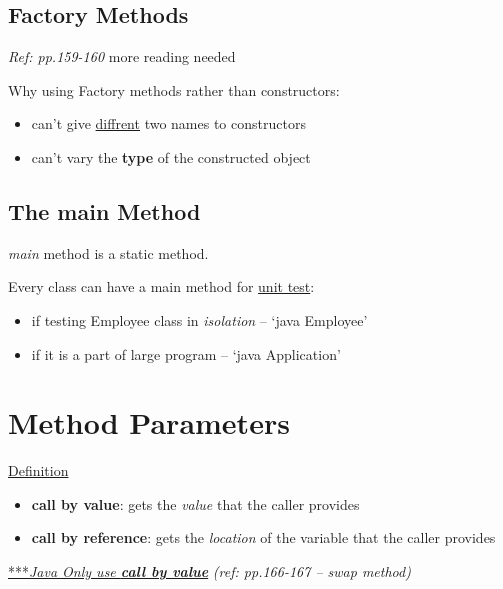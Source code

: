 \documentclass[12pt]{article}
\begin{document}
\subsection{Factory Methods}
\textit{Ref: pp.159-160} more reading needed

Why using Factory methods rather than constructors:
\begin{itemize}
    \item can't give \underline{diffrent} two names to constructors
    \item can't vary the \textbf{type} of the constructed object
\end{itemize}

\subsection{The main Method}
\emph{main} method is a static method.

Every class can have a main method for \underline{unit test}:
\begin{itemize}
    \item if testing Employee class in \textit{isolation} -- `java Employee'
    \item if it is a part of large program -- `java Application'
\end{itemize}

\section{Method Parameters}
\underline{Definition}
\begin{itemize}
    \item \textbf{call by value}: gets the \textit{value} that the caller provides
    \item \textbf{call by reference}: gets the \textit{location} of the variable that the caller provides
\end{itemize}

\underline{***\emph{Java Only use \textbf{call by value}}} \textit{(ref: pp.166-167 -- swap method)}
\end{document}

